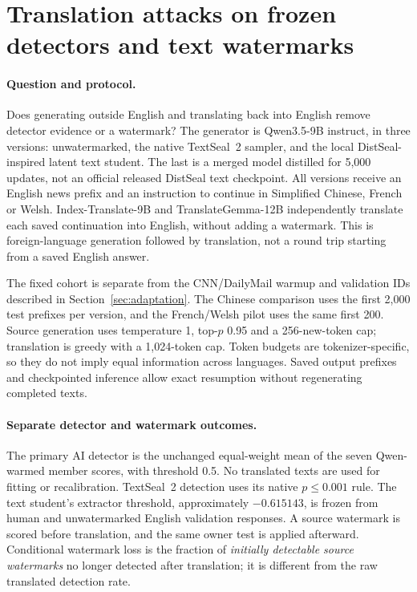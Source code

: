 \section{Translation attacks on frozen detectors and text watermarks}
\label{sec:translation_experiments}

\paragraph{Question and protocol.}
Does generating outside English and translating back into English remove
detector evidence or a watermark? The generator is Qwen3.5-9B instruct, in
three versions: unwatermarked, the native TextSeal~2 sampler, and the local
DistSeal-inspired latent text student. The last is a merged model distilled for
5,000 updates, not an official released DistSeal text checkpoint. All versions
receive an English news prefix and an instruction to continue in Simplified
Chinese, French or Welsh. Index-Translate-9B and TranslateGemma-12B independently
translate each saved continuation into English, without adding a watermark.
This is foreign-language generation followed by translation, not a round trip
starting from a saved English answer.

The fixed cohort is separate from the CNN/DailyMail warmup and validation IDs
described in Section~\ref{sec:adaptation}. The Chinese comparison uses
the first 2,000 test prefixes per version, and the French/Welsh pilot uses the
same first 200. Source generation uses temperature 1, top-$p$ 0.95 and a
256-new-token cap; translation is greedy with a 1,024-token cap. Token budgets
are tokenizer-specific, so they do not imply equal information across
languages. Saved output prefixes and checkpointed inference allow exact
resumption without regenerating completed texts.

\paragraph{Separate detector and watermark outcomes.}
The primary AI detector is the unchanged equal-weight mean of the seven
Qwen-warmed member scores, with threshold 0.5. No translated texts are used
for fitting or recalibration. TextSeal~2 detection uses its native
$p\leq 0.001$ rule. The text student's extractor threshold, approximately
$-0.615143$, is frozen from human and unwatermarked English validation
responses. A source watermark is scored before translation, and the same
owner test is applied afterward. Conditional watermark loss is the fraction
of \emph{initially detectable source watermarks} no longer detected after
translation; it is different from the raw translated detection rate.

